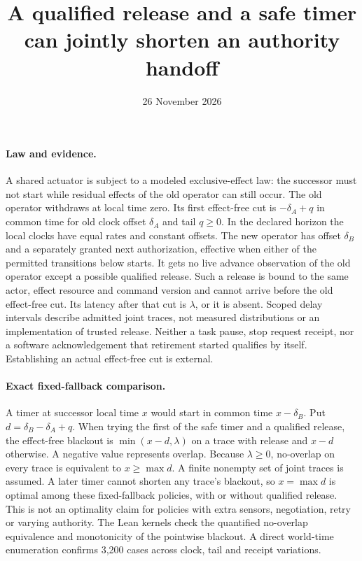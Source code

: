 \documentclass[11pt]{article}
\title{A qualified release and a safe timer can jointly shorten an authority handoff}
\date{26 November 2026}
\begin{document}
\maketitle
\paragraph{Law and evidence.}
A shared actuator is subject to a modeled exclusive-effect law:
the successor must not start while residual effects of the old
operator can still occur. The old operator withdraws at local
time zero. Its first effect-free cut is $-\delta_A+q$ in
common time for old clock offset $\delta_A$ and tail $q\ge0$.
In the declared horizon the local clocks have equal rates and
constant offsets. The new operator has offset $\delta_B$ and
a separately granted next authorization, effective when either
of the permitted transitions below starts. It gets no live
advance observation of the old operator except a possible
qualified release. Such a release is bound to the same actor,
effect resource and command version and cannot arrive before
the old effect-free cut. Its latency after that cut is $\lambda$,
or it is absent. Scoped delay intervals describe admitted
joint traces, not measured distributions or an implementation
of trusted release. Neither a task pause, stop request receipt,
nor a software acknowledgement that retirement started qualifies
by itself. Establishing an actual effect-free cut is external.

\paragraph{Exact fixed-fallback comparison.}
A timer at successor local time $x$ would start in common time
$x-\delta_B$. Put $d=\delta_B-\delta_A+q$.
When trying the first of the safe timer and a qualified release,
the effect-free blackout is $\min(x-d,\lambda)$ on a trace
with release and $x-d$ otherwise. A negative value represents
overlap. Because $\lambda\ge0$, no-overlap on every trace
is equivalent to $x\ge\max d$. A finite nonempty set of
joint traces is assumed. A later timer cannot shorten any
trace's blackout, so $x=\max d$ is optimal among these
fixed-fallback policies, with or without qualified release.
This is not an optimality claim for policies with extra sensors,
negotiation, retry or varying authority. The Lean kernels check
the quantified no-overlap equivalence and monotonicity of the
pointwise blackout. A direct world-time enumeration confirms
3{,}200 cases across clock, tail and receipt variations.
\end{document}

